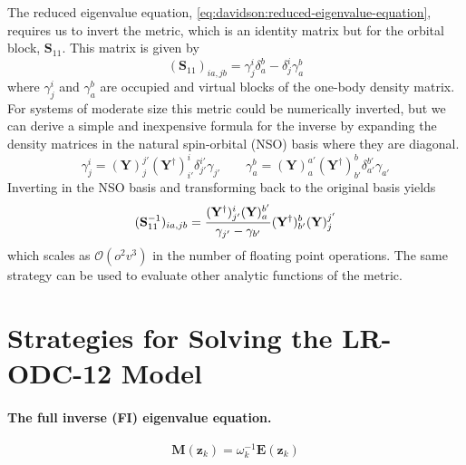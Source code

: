 The reduced eigenvalue equation, \cref{eq:davidson:reduced-eigenvalue-equation},
requires us to invert the metric, which is an identity matrix but for the
orbital block, \(\mathbf{S}_{11}\).
This matrix is given by
\begin{equation}
    (\mathbf{S}_{11})_{ia,jb}
    =
    \gamma^i_j
    \delta_a^b
    -
    \delta_j^i
    \gamma^b_a
\end{equation}
where
\(
    \gamma_j^i
\)
and
\(
    \gamma_a^b
\)
are occupied and virtual blocks of the one-body density matrix.
For systems of moderate size this metric could be numerically inverted, but we
can derive a simple and inexpensive formula for the inverse by expanding the
density matrices in the natural spin-orbital (NSO) basis where they are
diagonal.
\begin{equation}
    \gamma_j^i
    =
    (\mathbf{Y})_j^{j'}
    (\mathbf{Y}^\dagger)_{i'}^i
    \delta_{j'}^{i'}
    \gamma_{j'}
    \qquad
    \gamma_a^b
    =
    (\mathbf{Y})_a^{a'}
    (\mathbf{Y}^\dagger)_{b'}^b
    \delta_{a'}^{b'}
    \gamma_{a'}
\end{equation}
Inverting in the NSO basis and transforming back to the original basis yields
\begin{equation}
    (\mathbf{S}_{11}^{-1})_{ia,jb}
    =
    \frac{%
        (\mathbf{Y}^\dagger)_{j'}^i
        (\mathbf{Y})_a^{b'}
    }{%
        \gamma_{j'}-\gamma_{b'}
    }
    (\mathbf{Y}^\dagger)_{b'}^b
    (\mathbf{Y})_j^{j'}
\end{equation}
which scales as \(\mathcal{O}(o^2v^3)\) in the number of floating point
operations.
The same strategy can be used to evaluate other analytic functions of the
metric.


\section{Strategies for Solving the LR-ODC-12 Model}
\label{sec:davidson:strategies}

\paragraph{The full inverse (FI) eigenvalue equation.}
\begin{equation}
    \mathbf{M}(\mathbf{z}_k)
    =
    \omega_k^{-1}
    \mathbf{E}(\mathbf{z}_k)
\end{equation}

